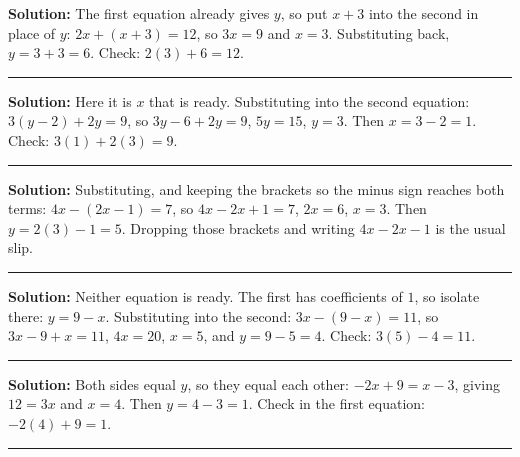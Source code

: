 \documentclass[12pt]{article}
\begin{document}



\textbf{Solution:} \quad The first equation already gives $y$, so put $x + 3$ into the second in
place of $y$: $2x + (x + 3) = 12$, so $3x = 9$ and $x = 3$. Substituting back,
$y = 3 + 3 = 6$. Check: $2(3) + 6 = 12$. 

\vspace{0.15cm}\noindent\rule{\linewidth}{0.2pt}


\textbf{Solution:} \quad Here it is $x$ that is ready. Substituting into the second equation:
$3(y - 2) + 2y = 9$, so $3y - 6 + 2y = 9$, $5y = 15$, $y = 3$. Then $x = 3 - 2 = 1$.
Check: $3(1) + 2(3) = 9$. 

\vspace{0.15cm}\noindent\rule{\linewidth}{0.2pt}


\textbf{Solution:} \quad Substituting, and keeping the brackets so the minus sign reaches both
terms: $4x - (2x - 1) = 7$, so $4x - 2x + 1 = 7$, $2x = 6$, $x = 3$. Then
$y = 2(3) - 1 = 5$. Dropping those brackets and writing $4x - 2x - 1$ is the usual slip.

\vspace{0.15cm}\noindent\rule{\linewidth}{0.2pt}


\textbf{Solution:} \quad Neither equation is ready. The first has coefficients of $1$, so isolate
there: $y = 9 - x$. Substituting into the second: $3x - (9 - x) = 11$, so $3x - 9 + x = 11$,
$4x = 20$, $x = 5$, and $y = 9 - 5 = 4$. Check: $3(5) - 4 = 11$. 

\vspace{0.15cm}\noindent\rule{\linewidth}{0.2pt}


\textbf{Solution:} \quad Both sides equal $y$, so they equal each other: $-2x + 9 = x - 3$, giving
$12 = 3x$ and $x = 4$. Then $y = 4 - 3 = 1$. Check in the first equation:
$-2(4) + 9 = 1$. 

\vspace{0.15cm}\noindent\rule{\linewidth}{0.2pt}

\end{document}
